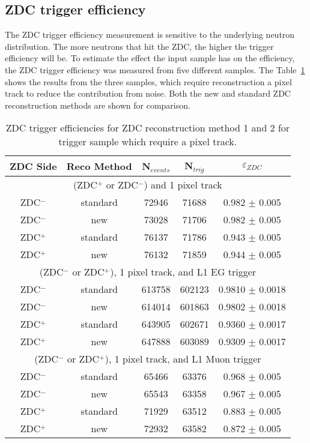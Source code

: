     \subsection{ZDC trigger efficiency}
      The ZDC trigger efficiency measurement is sensitive to the underlying 
        neutron distribution.
      The more neutrons that hit the ZDC, the higher the trigger efficiency 
        will be.
      To estimate the effect the input sample has on the efficiency, the ZDC 
        trigger efficiency was measured from five different samples.
      The Table~\ref{tab:zdcEfficiencySys} shows the results from the 
       three samples, which require reconstruction a pixel track to reduce
       the contribution from noise. 
      Both the new and standard ZDC reconstruction methods are shown for 
        comparison.
      \begin{table}
        \centering
        \begin{tabular}{|c|c|c|c|c|}
          \hline ZDC Side & Reco Method & N$_{events}$ & N$_{trig}$ & $\varepsilon_{ZDC}$ \\ \hline
           \multicolumn{5}{|c|}{(ZDC$^{+}$ or ZDC$^{-}$) and 1 pixel track} \\ \hline 
           ZDC$^{-}$ & standard & 72946  & 71688 & 0.982 $\pm$ 0.005 \\ \hline
           ZDC$^{-}$ & new & 73028  & 71706  & 0.982  $\pm$ 0.005  \\ \hline
           ZDC$^{+}$ & standard & 76137  & 71786  & 0.943  $\pm$ 0.005  \\ \hline
           ZDC$^{+}$ & new & 76132  & 71859  & 0.944  $\pm$ 0.005  \\ \hline
           \multicolumn{5}{|c|}{(ZDC$^{-}$ or ZDC$^{+}$), 1 pixel track, and L1 EG trigger } \\ \hline 
           ZDC$^{-}$ & standard & 613758  & 602123  & 0.9810 $\pm$ 0.0018 \\ \hline
           ZDC$^{-}$ & new & 614014  & 601863  & 0.9802 $\pm$ 0.0018 \\ \hline
           ZDC$^{+}$ & standard & 643905  & 602671  & 0.9360  $\pm$ 0.0017 \\ \hline
           ZDC$^{+}$ & new & 647888  & 603089  & 0.9309  $\pm$ 0.0017 \\ \hline
           \multicolumn{5}{|c|}{(ZDC$^{-}$ or ZDC$^{+}$), 1 pixel track, and L1 Muon trigger} \\ \hline 
           ZDC$^{-}$ & standard & 65466  & 63376  & 0.968 $\pm$ 0.005  \\ \hline
           ZDC$^{-}$ & new & 65543  & 63358  & 0.967 $\pm$ 0.005 \\ \hline
           ZDC$^{+}$ & standard & 71929  & 63512  & 0.883  $\pm$ 0.005 \\ \hline
           ZDC$^{+}$ & new & 72932  & 63582  & 0.872  $\pm$ 0.005 \\ \hline
         \end{tabular}
        \caption{ZDC trigger efficiencies for ZDC reconstruction method 1 and 
          2 for trigger sample which require a pixel track.}
        \label{tab:zdcEfficiencySys}
      \end{table}


